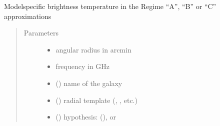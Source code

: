 \documentclass[letterpaper,10pt,english]{sphinxmanual}
\begin{document}
\begin{fulllineitems}
\label{\detokenize{diffsph:diffsph.pyflux.synch_TB_approx}}
\sphinxAtStartPar
Model\sphinxhyphen{}specific brightness temperature in the Regime “A”, “B” or “C” approximations
\begin{quote}\begin{description}
\item[{Parameters}] \leavevmode\begin{itemize}
\item {} 
\sphinxAtStartPar
{} \textendash{} angular radius in arcmin

\item {} 
\sphinxAtStartPar
{} \textendash{} frequency in GHz

\item {} 
\sphinxAtStartPar
{} () \textendash{} name of the galaxy

\item {} 
\sphinxAtStartPar
{} () \textendash{} radial template (, , etc.)

\item {} 
\sphinxAtStartPar
{} () \textendash{} hypothesis:  (),  or 


\end{itemize}
\end{description}
\end{quote}
\end{fulllineitems}
\end{document}
